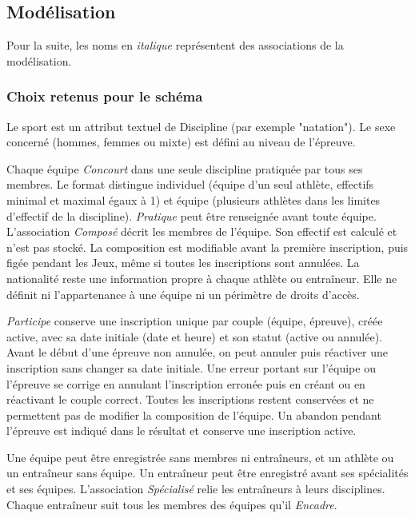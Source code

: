 \subsection{Modélisation}

Pour la suite, les noms en \emph{italique} représentent des associations de la modélisation.

\subsubsection{Choix retenus pour le schéma}

\begingroup
\setlength{\parskip}{0.55\baselineskip}

Le sport est un attribut textuel de Discipline (par exemple "natation"). Le sexe concerné (hommes, femmes ou mixte) est défini au niveau de l'épreuve.

Chaque équipe \emph{Concourt} dans une seule discipline pratiquée par tous ses membres. Le format distingue individuel (équipe d'un seul athlète, effectifs minimal et maximal égaux à 1) et équipe (plusieurs athlètes dans les limites d'effectif de la discipline). \emph{Pratique} peut être renseignée avant toute équipe. L'association \emph{Composé} décrit les membres de l'équipe. Son effectif est calculé et n'est pas stocké. La composition est modifiable avant la première inscription, puis figée pendant les Jeux, même si toutes les inscriptions sont annulées. La nationalité reste une information propre à chaque athlète ou entraîneur. Elle ne définit ni l'appartenance à une équipe ni un périmètre de droits d'accès.

\emph{Participe} conserve une inscription unique par couple (équipe, épreuve), créée active, avec sa date initiale (date et heure) et son statut (active ou annulée). Avant le début d'une épreuve non annulée, on peut annuler puis réactiver une inscription sans changer sa date initiale. Une erreur portant sur l'équipe ou l'épreuve se corrige en annulant l'inscription erronée puis en créant ou en réactivant le couple correct. Toutes les inscriptions restent conservées et ne permettent pas de modifier la composition de l'équipe. Un abandon pendant l'épreuve est indiqué dans le résultat et conserve une inscription active.

Une équipe peut être enregistrée sans membres ni entraîneurs, et un athlète ou un entraîneur sans équipe. Un entraîneur peut être enregistré avant ses spécialités et ses équipes. L'association \emph{Spécialisé} relie les entraîneurs à leurs disciplines. Chaque entraîneur suit tous les membres des équipes qu'il \emph{Encadre}.

